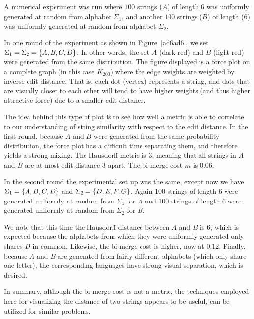 A numerical experiment was run
where \(100\) strings (\(A\)) of length \(6\) was
uniformly generated at random from alphabet \(\Sigma_1\),
and another \(100\) strings (\(B\)) of length (6) was uniformly generated
at random from alphabet \(\Sigma_2\).

In one round of the experiment as shown in Figure~\ref{ad6ad6},
we set \(\Sigma_1 = \Sigma_2 = \left\{A, B, C, D\right\}\).
In other words,
the set \(A\) (dark red) and \(B\) (light red)
were generated from the same distribution.
The figure displayed is a force plot on a complete graph
(in this case \(K_{200}\))
where the edge weights are weighted by inverse edit distance.
That is, each dot (vertex) represents a string,
and dots that are visually closer to each other will tend to have higher
weights (and thus higher attractive force) due to a smaller edit distance.

The idea behind this type of plot is to see how well a metric is able to
correlate to our understanding of string similarity with respect to
the edit distance.
In the first round, because \(A\) and \(B\) were generated from the same
probability distribution, the force plot has a difficult time separating them,
and therefore yields a strong mixing.
The Hausdorff metric is \(3\), meaning that all strings in \(A\) and \(B\)
are at most edit distance \(3\) apart.
The bi-merge cost \(m\) is 0.06.

In the second round the experimental set up was the same,
except now we have
\(\Sigma_1 = \left\{A, B, C, D\right\}\) and
\(\Sigma_2 = \left\{D, E, F, G\right\}\).
Again 100 strings of length \(6\) were generated
uniformly at random from \(\Sigma_1\) for \(A\)
and 100 strings of length \(6\) were generated
uniformly at random from \(\Sigma_2\) for \(B\).

We note that this time the Hausdorff distance between \(A\) and \(B\)
is \(6\),
which is expected because the alphabets from which they were uniformly
generated only shares \(D\) in common.
Likewise, the bi-merge cost is higher, now at \(0.12\).
Finally, because \(A\) and \(B\) are generated from fairly different
alphabets (which only share one letter),
the corresponding languages have strong visual separation,
which is desired.


In summary, although the bi-merge cost is not a metric,
the techniques employed here for visualizing the distance of two strings
appears to be useful,
can be utilized for similar problems.


